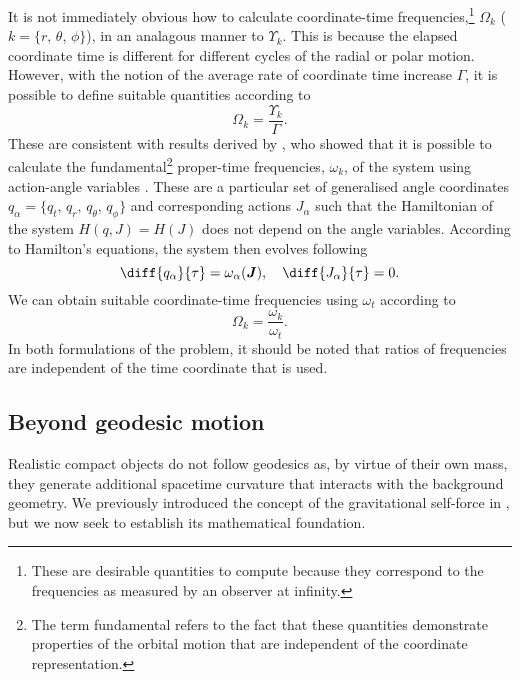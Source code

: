It is not immediately obvious how to calculate coordinate-time frequencies,\footnote{These are desirable quantities to compute because they correspond to the frequencies as measured by an observer at infinity.} $\Omega_k$ ($k=\{r,\,\theta,\,\phi\}$), in an analagous manner to $\Upsilon_k$. This is because the elapsed coordinate time is different for different cycles of the radial or polar motion. However, with the notion of the average rate of coordinate time increase $\Gamma$, it is possible to define suitable quantities according to
\begin{equation}
\Omega_k = \frac{\Upsilon_k}{\Gamma}.
\end{equation}
These are consistent with results derived by \citet{schmidt_celestial_2002}, who showed that it is possible to calculate the fundamental\footnote{The term fundamental refers to the fact that these quantities demonstrate properties of the orbital motion that are independent of the coordinate representation.} proper-time frequencies, $\omega_k$, of the system using action-angle variables \citep{goldstein_classical_2001}. These are a particular set of generalised angle coordinates $q_\alpha = \{q_t,\,q_r,\,q_\theta,\,q_\phi\}$ and corresponding actions $J_\alpha$ such that the Hamiltonian of the system $H(q,J) = H(J)$ does not depend on the angle variables. According to Hamilton's equations, the system then evolves following
\begin{equation}
\label{eq:EMRI-AAgeo}
\diff{q_\alpha}{\tau} = \omega_\alpha(\boldsymbol{J}), \quad \diff{J_\alpha}{\tau} = 0.
\end{equation}
We can obtain suitable coordinate-time frequencies using $\omega_t$ according to
\begin{equation}
\Omega_k = \frac{\omega_k}{\omega_t}.
\end{equation}
In both formulations of the problem, it should be noted that ratios of frequencies are independent of the time coordinate that is used.


\subsection{Beyond geodesic motion}
\label{sec:EMRI-beyond-geodesics}
Realistic compact objects do not follow geodesics as, by virtue of their own mass, they generate additional spacetime curvature that interacts with the background geometry. We previously introduced the concept of the gravitational self-force in , but we now seek to establish its mathematical foundation.

